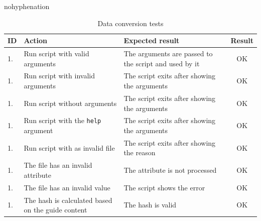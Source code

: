 \begin{hyphenrules}{nohyphenation}
	\begin{table}[ht]
		\begin{center}
			\begin{tabularx}{\textwidth}{l|p{4cm}Xc}
				\toprule[0.8mm]
				\textbf{ID} & \textbf{Action} & \textbf{Expected result} & \textbf{Result} \\
				\midrule[0.8mm] 
				\stepcounter{testsdatacounter}
				1.\thetestsdatacounter & Run script with valid arguments & The arguments are passed to the script and used by it & \cellcolor{green!25}OK \\
				\midrule 
				\stepcounter{testsdatacounter}
				1.\thetestsdatacounter & Run script with invalid arguments & The script exits after showing the arguments & \cellcolor{green!25}OK \\
				\midrule 
				\stepcounter{testsdatacounter}
				1.\thetestsdatacounter & Run script without arguments & The script exits after showing the arguments & \cellcolor{green!25}OK \\
				\midrule 
				\stepcounter{testsdatacounter}
				1.\thetestsdatacounter & Run script with the \texttt{help} argument & The script exits after showing the arguments & \cellcolor{green!25}OK \\
				\midrule 
				\stepcounter{testsdatacounter}
				1.\thetestsdatacounter & Run script with as invalid \citeproper{ODS} file & The script exits after showing the reason & \cellcolor{green!25}OK \\
				\midrule 
				\stepcounter{testsdatacounter}
				1.\thetestsdatacounter & The \citeproper{ODS} file has an invalid attribute & The attribute is not processed & \cellcolor{green!25}OK \\
				\midrule 
				\stepcounter{testsdatacounter}
				1.\thetestsdatacounter & The \citeproper{ODS} file has an invalid value & The script shows the error & \cellcolor{green!25}OK \\
				\midrule 
				\stepcounter{testsdatacounter}
				1.\thetestsdatacounter & The hash is calculated based on the guide content & The hash is valid & \cellcolor{green!25}OK \\
				\bottomrule[0.8mm]
			\end{tabularx}
		\end{center}
		\caption*{Data conversion tests}
	\end{table}
\end{hyphenrules}


